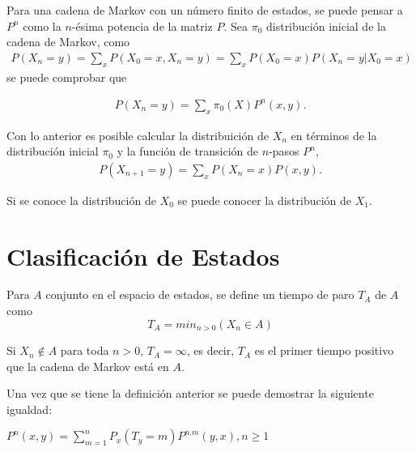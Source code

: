 \begin{Note}
Para una cadena de Markov con un número finito de estados, se puede pensar a $P^{n}$ como la $n$-ésima potencia de la matriz $P$. Sea $\pi_{0}$ distribución inicial de la cadena de Markov, como 
\begin{eqnarray}
P\left(X_{n}=y\right)=\sum_{x} P\left(X_{0}=x,X_{n}=y\right)=\sum_{x} P\left(X_{0}=x\right)P\left(X_{n}=y|X_{0}=x\right)
\end{eqnarray}
se puede comprobar que 

\begin{eqnarray}
P\left(X_{n}=y\right)=\sum_{x} \pi_{0}\left(X\right)P^{n}\left(x,y\right).
\end{eqnarray}
\end{Note}

Con lo anterior es posible calcular la distribuición de $X_{n}$ en términos de la distribución inicial $\pi_{0}$ y la función de transición de $n$-pasos $P^{n}$,
\begin{eqnarray}
P\left(X_{n+1}=y\right)=\sum_{x} P\left(X_{n}=x\right)P\left(x,y\right).
\end{eqnarray}

Si se conoce la distribución de $X_{0}$ se puede conocer la distribución de $X_{1}$.

\section{Clasificación de Estados}

\begin{Def}
Para $A$ conjunto en el espacio de estados, se define un tiempo de paro $T_{A}$ de $A$ como
\begin{equation}
T_{A}=min_{n>0}\left(X_{n}\in A\right)
\end{equation}
\end{Def}

\begin{Note}
Si $X_{n}\notin A$ para toda $n>0$, $T_{A}=\infty$, es decir,  $T_{A}$ es el primer tiempo positivo que la cadena de Markov está en $A$.
\end{Note}

Una vez que se tiene la definición anterior se puede demostrar la siguiente igualdad:

\begin{Prop}
$P^{n}\left(x,y\right)=\sum_{m=1}^{n}P_{x}\left(T_{y}=m\right)P^{n.m}\left(y,x\right), n\geq1$
\end{Prop}

